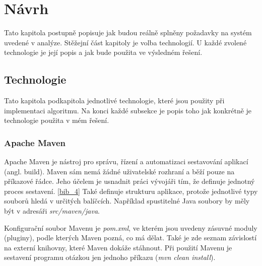 \documentclass[
  digital, %
  table,   %
  nolof,     %
  nolot,     %
  oneside, %
  nocover,
  monochrome,
  12pt
]{fithesis3}
\begin{document}
\chapter{Návrh}
Tato kapitola postupně popisuje jak budou reálně splněny požadavky na systém uvedené v analýze. Stěžejní část kapitoly je volba technologií. U každé zvolené technologie je její popis a jak bude použita ve výsledném řešení.

\section{Technologie}
Tato kapitola podkapitola jednotlivé technologie, které jsou použity při implementaci algoritmu. Na konci každé subsekce je popis toho jak konkrétně je technologie použita v mém řešení.

\subsection{Apache Maven}
Apache Maven je nástroj pro správu, řízení a automatizaci sestavování aplikací (angl. build). Maven sám nemá žádné uživatelské rozhraní a běží pouze na příkazové řádce. Jeho účelem je usnadnit práci vývojáři tím, že definuje jednotný proces sestavení. \ref{bib_4} Také definuje strukturu aplikace, protože jednotlivé typy souborů hledá v určitých balíčcích. Například spustitelné Java soubory by měly být v adresáři \textit{src/maven/java}.

Konfigurační soubor Mavenu je \textit{pom.xml}, ve kterém jsou uvedeny zásuvné moduly (pluginy), podle kterých Maven pozná, co má dělat. Také je zde seznam závislostí na externí knihovny, které Maven dokáže stáhnout. Při použití Mavenu je sestavení programu otázkou jen jednoho příkazu (\textit{mvn clean install}).
\end{document}

